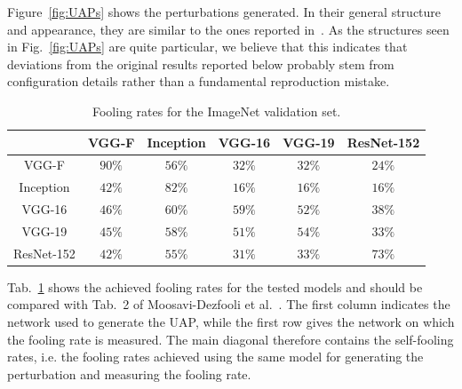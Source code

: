 \documentclass[runningheads]{llncs}
\begin{document}
Figure~\ref{fig:UAPs} shows the perturbations generated. In their general structure and appearance, they are similar to the ones reported in~\cite{moosavidezfooli_universal_2017}. As the structures seen in Fig.~\ref{fig:UAPs} are quite particular, we believe that this indicates that deviations from the original results reported below probably stem from configuration details rather than a fundamental reproduction mistake.

\begin{table}[htbp]
\centering
\caption{Fooling rates for the ImageNet validation set.}
\begin{tabular}{|c|c|c|c|c|c|}
\hline

			& VGG-F		&	Inception	&	VGG-16		&	VGG-19		&	ResNet-152	\\ \hline
VGG-F		& $90\%$	&	$56\%$		&	$32\%$		&	$32\%$		& 	$24\%$		\\
Inception	& $42\%$	&	$82\%$		&	$16\%$		&	$16\%$		& 	$16\%$	\\
VGG-16		& $46\%$	&	$60\%$		&	$59\%$		&	$52\%$		& 	$38\%$	\\
VGG-19		& $45\%$	&	$58\%$		&	$51\%$		&	$54\%$		& 	$33\%$	\\
ResNet-152	& $42\%$	&	$55\%$		&	$31\%$		&	$33\%$		& 	$73\%$	\\
\hline 
\end{tabular}
\label{tbl_stoerraten_reprod_kreuz_linf}
\end{table}

Tab.~\ref{tbl_stoerraten_reprod_kreuz_linf} shows the achieved fooling rates for the tested models and should be compared with Tab.~2 of Moosavi-Dezfooli et al.~\cite{moosavidezfooli_universal_2017}. The first column indicates the network used to generate the UAP, while the first row gives the network on which the fooling rate is measured. The main diagonal therefore contains the self-fooling rates, i.e. the fooling rates achieved using the same model for generating the perturbation and measuring the fooling rate. 
\end{document}
